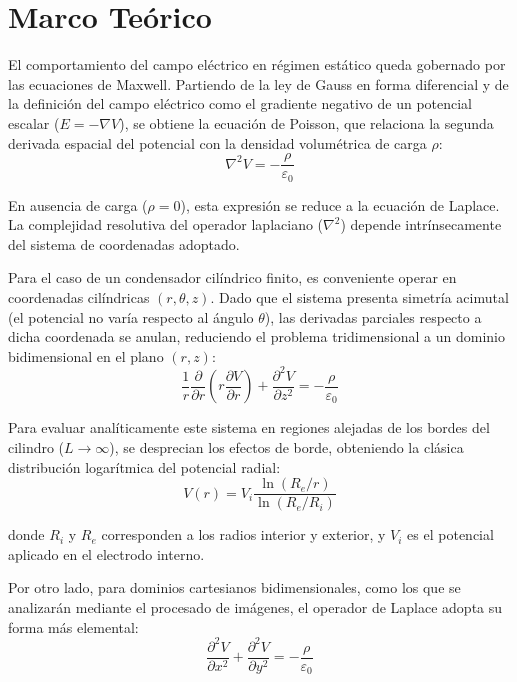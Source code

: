 \section{Marco Teórico}

El comportamiento del campo eléctrico en régimen estático queda gobernado por las ecuaciones de Maxwell. Partiendo de la ley de Gauss en forma diferencial y de la definición del campo eléctrico como el gradiente negativo de un potencial escalar ($E = -\nabla V$), se obtiene la ecuación de Poisson, que relaciona la segunda derivada espacial del potencial con la densidad volumétrica de carga $\rho$:
\begin{equation}
    \nabla^2 V = -\frac{\rho}{\varepsilon_0}
    \label{eq:poisson_general}
\end{equation}

En ausencia de carga ($\rho = 0$), esta expresión se reduce a la ecuación de Laplace. La complejidad resolutiva del operador laplaciano ($\nabla^2$) depende intrínsecamente del sistema de coordenadas adoptado. 

Para el caso de un condensador cilíndrico finito, es conveniente operar en coordenadas cilíndricas $(r, \theta, z)$. Dado que el sistema presenta simetría acimutal (el potencial no varía respecto al ángulo $\theta$), las derivadas parciales respecto a dicha coordenada se anulan, reduciendo el problema tridimensional a un dominio bidimensional en el plano $(r, z)$:
\begin{equation}
    \frac{1}{r}\frac{\partial}{\partial r}\left(r \frac{\partial V}{\partial r}\right) + \frac{\partial^2 V}{\partial z^2} = -\frac{\rho}{\varepsilon_0}
    \label{eq:poisson_cilindrica}
\end{equation}

Para evaluar analíticamente este sistema en regiones alejadas de los bordes del cilindro ($L \to \infty$), se desprecian los efectos de borde, obteniendo la clásica distribución logarítmica del potencial radial:
\begin{equation}
    V(r) = V_i \frac{\ln(R_e / r)}{\ln(R_e / R_i)}
    \label{eq:potencial_analitico_cilindro}
\end{equation}

donde $R_i$ y $R_e$ corresponden a los radios interior y exterior, y $V_i$ es el potencial aplicado en el electrodo interno.

Por otro lado, para dominios cartesianos bidimensionales, como los que se analizarán mediante el procesado de imágenes, el operador de Laplace adopta su forma más elemental:
\begin{equation}
    \frac{\partial^2 V}{\partial x^2} + \frac{\partial^2 V}{\partial y^2} = -\frac{\rho}{\varepsilon_0}
    \label{eq:poisson_cartesiana}
\end{equation}

